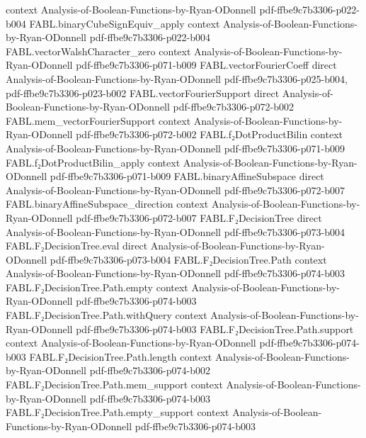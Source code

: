 \begin{theorem}
  {context}
  {Analysis-of-Boolean-Functions-by-Ryan-ODonnell}
  {pdf-ffbe9c7b3306-p022-b004}
\proofstep
  {FABL.binaryCubeSignEquiv_apply}
  {context}
  {Analysis-of-Boolean-Functions-by-Ryan-ODonnell}
  {pdf-ffbe9c7b3306-p022-b004}
\proofstep
  {FABL.vectorWalshCharacter_zero}
  {context}
  {Analysis-of-Boolean-Functions-by-Ryan-ODonnell}
  {pdf-ffbe9c7b3306-p071-b009}
\proofstep
  {FABL.vectorFourierCoeff}
  {direct}
  {Analysis-of-Boolean-Functions-by-Ryan-ODonnell}
  {pdf-ffbe9c7b3306-p025-b004,
    pdf-ffbe9c7b3306-p023-b002}
\proofstep
  {FABL.vectorFourierSupport}
  {direct}
  {Analysis-of-Boolean-Functions-by-Ryan-ODonnell}
  {pdf-ffbe9c7b3306-p072-b002}
\proofstep
  {FABL.mem_vectorFourierSupport}
  {context}
  {Analysis-of-Boolean-Functions-by-Ryan-ODonnell}
  {pdf-ffbe9c7b3306-p072-b002}
\proofstep
  {FABL.f₂DotProductBilin}
  {context}
  {Analysis-of-Boolean-Functions-by-Ryan-ODonnell}
  {pdf-ffbe9c7b3306-p071-b009}
\proofstep
  {FABL.f₂DotProductBilin_apply}
  {context}
  {Analysis-of-Boolean-Functions-by-Ryan-ODonnell}
  {pdf-ffbe9c7b3306-p071-b009}
\proofstep
  {FABL.binaryAffineSubspace}
  {direct}
  {Analysis-of-Boolean-Functions-by-Ryan-ODonnell}
  {pdf-ffbe9c7b3306-p072-b007}
\proofstep
  {FABL.binaryAffineSubspace_direction}
  {context}
  {Analysis-of-Boolean-Functions-by-Ryan-ODonnell}
  {pdf-ffbe9c7b3306-p072-b007}
\proofstep
  {FABL.F₂DecisionTree}
  {direct}
  {Analysis-of-Boolean-Functions-by-Ryan-ODonnell}
  {pdf-ffbe9c7b3306-p073-b004}
\proofstep
  {FABL.F₂DecisionTree.eval}
  {direct}
  {Analysis-of-Boolean-Functions-by-Ryan-ODonnell}
  {pdf-ffbe9c7b3306-p073-b004}
\proofstep
  {FABL.F₂DecisionTree.Path}
  {context}
  {Analysis-of-Boolean-Functions-by-Ryan-ODonnell}
  {pdf-ffbe9c7b3306-p074-b003}
\proofstep
  {FABL.F₂DecisionTree.Path.empty}
  {context}
  {Analysis-of-Boolean-Functions-by-Ryan-ODonnell}
  {pdf-ffbe9c7b3306-p074-b003}
\proofstep
  {FABL.F₂DecisionTree.Path.withQuery}
  {context}
  {Analysis-of-Boolean-Functions-by-Ryan-ODonnell}
  {pdf-ffbe9c7b3306-p074-b003}
\proofstep
  {FABL.F₂DecisionTree.Path.support}
  {context}
  {Analysis-of-Boolean-Functions-by-Ryan-ODonnell}
  {pdf-ffbe9c7b3306-p074-b003}
\proofstep
  {FABL.F₂DecisionTree.Path.length}
  {context}
  {Analysis-of-Boolean-Functions-by-Ryan-ODonnell}
  {pdf-ffbe9c7b3306-p074-b002}
\proofstep
  {FABL.F₂DecisionTree.Path.mem_support}
  {context}
  {Analysis-of-Boolean-Functions-by-Ryan-ODonnell}
  {pdf-ffbe9c7b3306-p074-b003}
\proofstep
  {FABL.F₂DecisionTree.Path.empty_support}
  {context}
  {Analysis-of-Boolean-Functions-by-Ryan-ODonnell}
  {pdf-ffbe9c7b3306-p074-b003}

\end{theorem}
